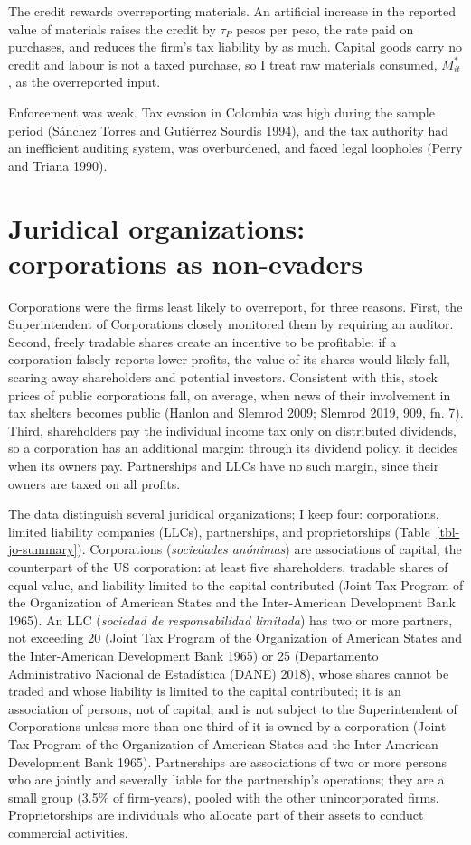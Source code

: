 \documentclass[
  12pt,
  letterpaper,
  oneside,
  openany]{report}
\begin{document}
The credit rewards overreporting materials. An artificial increase in
the reported value of materials raises the credit by \(\tau_P\) pesos
per peso, the rate paid on purchases, and reduces the firm's tax
liability by as much. Capital goods carry no credit and labour is not a
taxed purchase, so I treat raw materials consumed, \(M^*_{it}\), as the
overreported input.

Enforcement was weak. Tax evasion in Colombia was high during the sample
period (Sánchez Torres and Gutiérrez Sourdis 1994), and the tax
authority had an inefficient auditing system, was overburdened, and
faced legal loopholes (Perry and Triana 1990).

\section{Juridical organizations: corporations as
non-evaders}\label{sec-setting-jo}

Corporations were the firms least likely to overreport, for three
reasons. First, the Superintendent of Corporations closely monitored
them by requiring an auditor. Second, freely tradable shares create an
incentive to be profitable: if a corporation falsely reports lower
profits, the value of its shares would likely fall, scaring away
shareholders and potential investors. Consistent with this, stock prices
of public corporations fall, on average, when news of their involvement
in tax shelters becomes public (Hanlon and Slemrod 2009; Slemrod 2019,
909, fn. 7). Third, shareholders pay the individual income tax only on
distributed dividends, so a corporation has an additional margin:
through its dividend policy, it decides when its owners pay.
Partnerships and LLCs have no such margin, since their owners are taxed
on all profits.

The data distinguish several juridical organizations; I keep four:
corporations, limited liability companies (LLCs), partnerships, and
proprietorships (Table~\ref{tbl-jo-summary}). Corporations
(\emph{sociedades anónimas}) are associations of capital, the
counterpart of the US corporation: at least five shareholders, tradable
shares of equal value, and liability limited to the capital contributed
(Joint Tax Program of the Organization of American States and the
Inter-American Development Bank 1965). An LLC (\emph{sociedad de
responsabilidad limitada}) has two or more partners, not exceeding 20
(Joint Tax Program of the Organization of American States and the
Inter-American Development Bank 1965) or 25 (Departamento Administrativo
Nacional de Estadística (DANE) 2018), whose shares cannot be traded and
whose liability is limited to the capital contributed; it is an
association of persons, not of capital, and is not subject to the
Superintendent of Corporations unless more than one-third of it is owned
by a corporation (Joint Tax Program of the Organization of American
States and the Inter-American Development Bank 1965). Partnerships are
associations of two or more persons who are jointly and severally liable
for the partnership's operations; they are a small group (3.5\% of
firm-years), pooled with the other unincorporated firms. Proprietorships
are individuals who allocate part of their assets to conduct commercial
activities.
\end{document}
